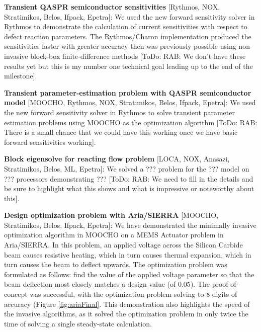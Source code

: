 \documentclass[pdf,ps2pdf,11pt]{SANDreport}
\begin{document}

{}\noindent\textbf{Transient QASPR semiconductor sensitivities} [Rythmos, NOX,
Stratimikos, Belos, Ifpack, Epetra]: We used the new forward sensitivity
solver in Rythmos to demonstrate the calculation of current sensitivities with
respect to defect reaction parameters.  The Rythmos/Charon implementation
produced the sensitivities faster with greater accuracy then was previously
possible using non-invasive block-box finite-difference methods [ToDo: RAB: We
don't have these results yet but this is my number one technical goal leading
up to the end of the milestone].


{}\noindent\textbf{Transient parameter-estimation problem with QASPR
semiconductor model} [MOOCHO, Rythmos, NOX, Stratimikos, Belos, Ifpack,
Epetra]: We used the new forward sensitivity solver in Rythmos to solve
transient parameter estimation problems using MOOCHO as the optimization
algorithm [ToDo: RAB: There is a small chance that we could have this working
once we have basic forward sensitivities working].

{}\noindent\textbf{Block eigensolve for reacting flow problem} [LOCA, NOX,
Anasazi, Stratimikos, Belos, ML, Epetra]: We solved a ??? problem for the ???
model on ??? processors demonstrating ??? [ToDo: RAB: We need to fill in the
details and be sure to highlight what this shows and what is impressive or
noteworthy about this].

{}\noindent\textbf{Design optimization problem with Aria/SIERRA} [MOOCHO,
Stratimikos, Belos, Ifpack, Epetra]: We have demonstrated the minimally
invasive optimization algorithm in MOOCHO on a MEMS Actuator problem in
Aria/SIERRA.  In this problem, an applied voltage across the Silicon Carbide
beam causes resistive heating, which in turn causes thermal expansion, which
in turn causes the beam to deflect upwards. The optimization problem was
formulated as follows: find the value of the applied voltage parameter so that
the beam deflection most closely matches a design value (of $0.05$). The
proof-of-concept was successful, with the optimization problem solving to $8$
digits of accuracy (Figure {}\ref{fig:ariaFinal}. This demonstration also
highlights the speed of the invasive algorithms, as it solved the optimization
problem in only twice the time of solving a single steady-state calculation.
\end{document}
